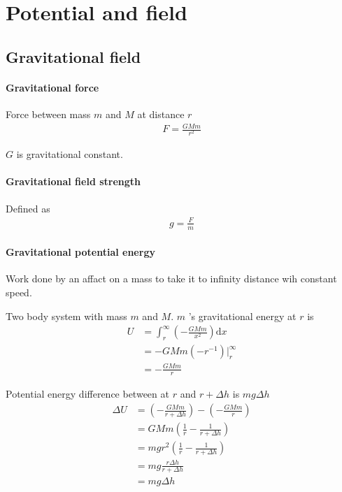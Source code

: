 \section{Potential and field}
    \subsection{Gravitational field}
        \paragraph{Gravitational force}
            Force between mass $m$ and $M$ at distance $r$ 
            \begin{align}
                F = \frac{G M m}{r^2}
            \end{align}

            $G$ is gravitational constant.

        \paragraph{Gravitational field strength}
            Defined as 
            \begin{align}
                g = \frac{F}{m}
            \end{align}

        \paragraph{Gravitational potential energy}
            Work done by an affact on a mass to take it to infinity distance wih constant speed.

            Two body system with mass $m$ and $M$.  $m$ 's gravitational energy at $r$ is
            \begin{align}
                U &= \int_{r}^{\infty} (- \frac{G M m}{x^2}) \mathrm{d} x \\
                  &= - G M m (- r^{-1}) |_r^\infty \\
                  &= - \frac{G M m}{r}
            \end{align}

            Potential energy difference between at $r$ and $r + \Delta h$ is $m g \Delta h$
            \begin{align}
                \Delta U &= (- \frac{G M m}{r + \Delta h}) - (- \frac{G M m}{r}) \\
                         &= G M m (\frac{1}{r} - \frac{1}{r + \Delta h}) \\
                         &= m g r^2 (\frac{1}{r} - \frac{1}{r + \Delta h}) \\
                         &= m g \frac{r \Delta h}{r + \Delta h} \\
                         &= mg \Delta h
            \end{align}
        
